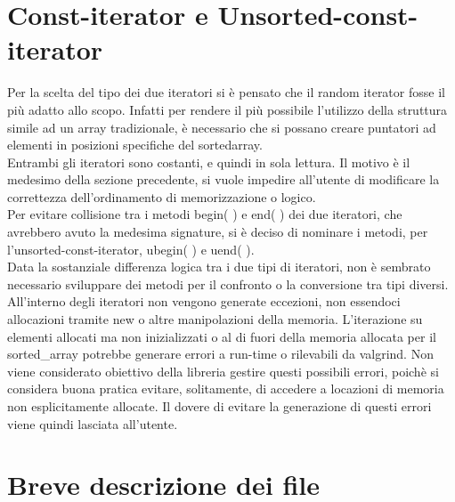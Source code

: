 \documentclass[11pt]{article}
\begin{document}
\section*{Const-iterator e Unsorted-const-iterator}
Per la scelta del tipo dei due iteratori si è pensato che il random iterator fosse il più adatto allo scopo. Infatti per rendere il più possibile l'utilizzo della struttura simile ad un array tradizionale, è necessario che si possano creare puntatori ad elementi in posizioni specifiche del sortedarray.\\
Entrambi gli iteratori sono costanti, e quindi in sola lettura. Il motivo è il medesimo della sezione precedente, si vuole impedire all'utente di modificare la correttezza dell'ordinamento di memorizzazione o logico.\\
Per evitare collisione tra i metodi begin( ) e end( ) dei due iteratori, che avrebbero avuto la medesima signature, 
si è deciso di nominare i metodi, per l'unsorted-const-iterator, ubegin( ) e uend( ).\\
Data la sostanziale differenza logica tra i due tipi di iteratori, non è sembrato necessario sviluppare dei metodi 
per il confronto o la conversione tra tipi diversi.\\
All'interno degli iteratori non vengono generate eccezioni, non essendoci allocazioni tramite new o altre manipolazioni della memoria. L'iterazione su elementi allocati ma non inizializzati o al di fuori della memoria 
allocata per il sorted\_array potrebbe generare errori a run-time o rilevabili da valgrind. Non viene considerato 
obiettivo della libreria gestire questi possibili errori, poichè si considera buona pratica evitare, solitamente, di 
accedere a locazioni di memoria non esplicitamente allocate. Il dovere di evitare la generazione di questi errori 
viene quindi lasciata all'utente. 
\section*{Breve descrizione dei file}
\end{document}
